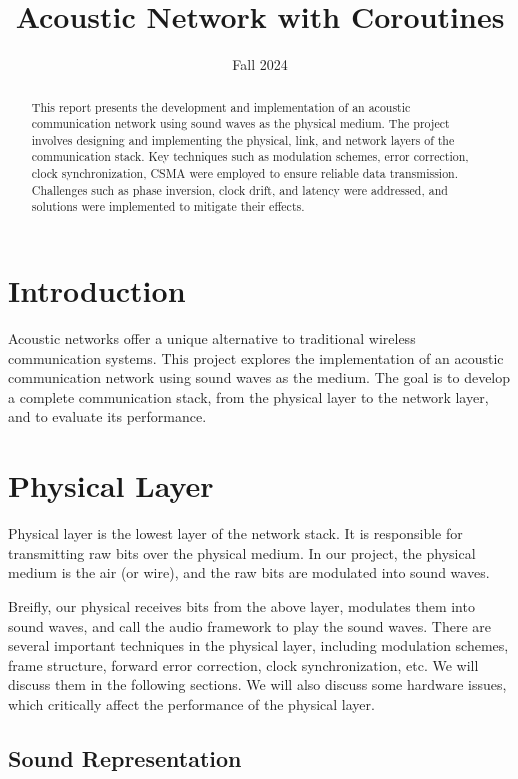 \documentclass{article}
\title{Acoustic Network with Coroutines}
\author{}
\date{Fall 2024}
\begin{document}
\maketitle

\begin{abstract}
This report presents the development and implementation of an acoustic communication network using sound waves as the physical medium.
The project involves designing and implementing the physical, link, and network layers of the communication stack.
Key techniques such as modulation schemes, error correction, clock synchronization, CSMA were employed to ensure reliable data transmission.
Challenges such as phase inversion, clock drift, and latency were addressed, and solutions were implemented to mitigate their effects.
\end{abstract}

\tableofcontents

\section{Introduction}

Acoustic networks offer a unique alternative to traditional wireless communication systems.
This project explores the implementation of an acoustic communication network using sound waves as the medium.
The goal is to develop a complete communication stack, from the physical layer to the network layer, and to evaluate its performance.

\section{Physical Layer}

Physical layer is the lowest layer of the network stack.
It is responsible for transmitting raw bits over the physical medium.
In our project, the physical medium is the air (or wire), and the raw bits are modulated into sound waves.

Breifly, our physical receives bits from the above layer, modulates them into sound waves, and call the audio framework to play the sound waves.
There are several important techniques in the physical layer, including modulation schemes, frame structure, forward error correction, clock synchronization, etc. We will discuss them in the following sections.
We will also discuss some hardware issues, which critically affect the performance of the physical layer.

\subsection{Sound Representation}
\end{document}

